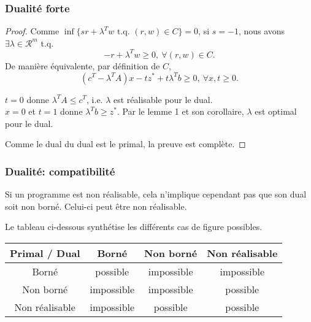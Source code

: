 \documentclass[usepdftitle=false]{beamer}
\def\cR{\mathcal{R}}
\begin{document}
\begin{frame}
\frametitle{Dualité forte}

\begin{proof}
Comme $\inf \lbrace s r + \lambda^T w \mbox{ t.q. } (r,w) \in C \rbrace = 0$, si $s = -1$, nous avons $\exists \lambda \in \cR^m$ t.q.
\[
-r + \lambda^Tw \geq 0,\ \forall (r,w) \in C.
\]
De manière équivalente, par définition de $C$,
\[
(c^T-\lambda^TA)x - tz^* + t\lambda^T b \geq 0,\ \forall x, t \geq 0.
\]

\mbox{}

$t = 0$ donne $\lambda^T A \leq c^T$, i.e. $\lambda$ est réalisable pour le dual.\\
$x = 0$ et $t = 1$ donne $\lambda^T b \geq z^*$. Par le lemme 1 et son corollaire, $\lambda$ est optimal pour le dual.

\mbox{}

Comme le dual du dual est le primal, la preuve est complète.
\end{proof}

\end{frame}

\begin{frame}
\frametitle{Dualité: compatibilité}

Si un programme est non réalisable, cela n'implique cependant pas que son dual soit non borné. Celui-ci peut être non réalisable.

\mbox{}

Le tableau ci-dessous synthétise les différents cas de figure possibles.

\begin{center}
\begin{tabular}{|c||c|c|c|}
\hline
Primal / Dual & Borné & Non borné & Non réalisable \\
\hline
\hline
Borné & possible & impossible & impossible \\
\hline
Non borné & impossible & impossible & possible \\
\hline
Non réalisable & impossible & possible & possible \\
\hline
\end{tabular}
\end{center}

\end{frame}
\end{document}
